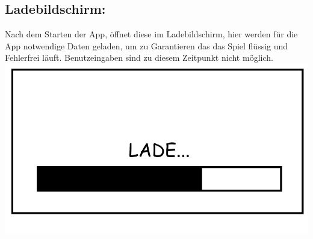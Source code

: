 \documentclass{scrartcl}
\begin{document}
\begin{enumerate}
	\begin{minipage}{1\textwidth}
		\item \subsection*{Ladebildschirm:} \label{appaufbau:Ladebildschirm}
		Nach dem Starten der App, öffnet diese im Ladebildschirm, hier werden für die App notwendige Daten geladen, um zu Garantieren das das Spiel flüssig und Fehlerfrei läuft. Benutzeingaben sind zu diesem Zeitpunkt nicht möglich.\\
		\includegraphics[scale=0.5]{assets/LoadScreen}
	\end{minipage}
	
	\begin{minipage}{1\textwidth}
		

\end{minipage}
\end{enumerate}
\end{document}
